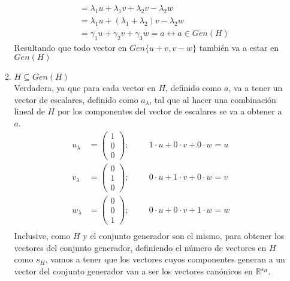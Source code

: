 \documentclass{article}
\begin{document}
\begin{enumerate}
\begin{enumerate}[label=\listAlph]
\[\begin{aligned}
                        &= \lambda_1u + \lambda_1v + \lambda_2v - \lambda_2w \\
                        &= \lambda_1u + \left(\lambda_1 + \lambda_2\right)v - \lambda_2w \\
                        &= \gamma_1u + \gamma_2v + \gamma_3w = a \leftrightarrow
                        a \in Gen\left(H\right)
                    \end{aligned}
                \]
                Resultando que todo vector en \(Gen\{u + v, v - w\}\) también va a estar en \(Gen(H)\)
            \item \(H \subseteq Gen\left(H\right)\) \\
                Verdadera, ya que para cada vector en \(H\), definido como \(a\), va a tener un vector de escalares, definido como \(a_{\lambda}\), tal que 
                al hacer una combinación lineal de \(H\) por los componentes del vector de escalares se va a obtener a \(a\).
                \[
                    \begin{aligned}
                        u_{\lambda} &= \begin{pmatrix} 1 \\ 0 \\ 0 \end{pmatrix}; \hspace{1cm}
                        1 \cdot u + 0 \cdot v + 0 \cdot w = u \\
                        v_{\lambda} &= \begin{pmatrix} 0 \\ 1 \\ 0 \end{pmatrix}; \hspace{1cm}
                        0 \cdot u + 1 \cdot v + 0 \cdot w = v \\
                        w_{\lambda} &= \begin{pmatrix} 0 \\ 0 \\ 1 \end{pmatrix}; \hspace{1cm}
                        0 \cdot u + 0 \cdot v + 1 \cdot w = w \\
                    \end{aligned}
                \]
                Inclusive, como \(H\) y el conjunto generador son el mismo, para obtener los vectores del conjunto generador, definiendo el número de vectores en \(H\) como \(s_H\),
                vamos a tener que los vectores cuyos componentes generan a un vector del conjunto generador van a ser los vectores canónicos en \(\mathbb{R}^{s_H}\).

\end{enumerate}
\end{enumerate}
\end{document}
